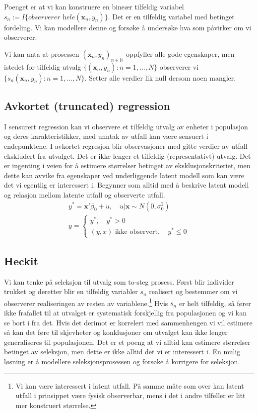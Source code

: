 Poenget er at vi kan konstruere en bineær tilfeldig variabel $s_n := I\{\textit{observerer hele} (\mathbf{x}_n,y_n)\}$. Det er en tilfeldig variabel med betinget fordeling. Vi kan modellere denne og forsøke å undersøke hva som påvirker om vi observerer.

Vi kan anta at prosessen $(\mathbf{x}_n,y_n)_{n\in \mathbb{N}}$ oppfyller alle gode egenskaper, men istedet for tilfeldig utvalg $\{(\mathbf{x}_n,y_n):n=1,\dots,N\}$ observerer vi $\{s_n(\mathbf{x}_n,y_n):n=1,\dots,N\}$. Setter alle verdier lik null dersom noen mangler.
\subsection{Avkortet (truncated) regression}
I sensurert regression kan vi observere et tilfeldig utvalg av enheter i populasjon og deres karakteristikker, med unntak av utfall kan være sensuert i endepunktene. I avkortet regresjon blir observasjoner med gitte verdier av utfall ekskludert fra utvalget. Det er ikke lenger et tilfeldig (representativt) utvalg. Det er ingenting i veien for å estimere størrelser betinget av eksklusjonskriteriet, men dette kan avvike fra egenskaper ved underliggende latent modell som kan være det vi egentlig er interessert i. Begynner som alltid med å beskrive latent modell og relasjon mellom latente utfall og observerte utfall.
\begin{align}
y^* = \mathbf{x}'\beta_0 + u, \quad u|\mathbf{x} \sim N(0,\sigma_0^2) \\
y = \begin{cases}
y^*, \quad y^*>0 \\
(y,x)\text{ ikke observert}, \quad y^* \leq 0
\end{cases}
\end{align}
\subsection{Heckit}
Vi kan tenke på seleksjon til utvalg som to-steg prosess. Først blir individer trukket og deretter blir en tilfeldig variabler $s_n$ realisert og bestemmer om vi observerer realiseringen av resten av variablene.\footnote{Vi kan være interessert i latent utfall. På samme måte som over kan latent utfall i prinsippet være fysisk observerbar, mens i det i andre tilfeller er litt mer konstruert størrelse.} Hvis $s_n$ er helt tilfeldig, så fører ikke frafallet til at utvalget er systematisk forskjellig fra populasjonen og vi kan se bort i fra det. Hvis det derimot er korrelert med sammenhengen vi vil estimere så kan det føre til skjevheter og konklusjoner om utvalget kan ikke lenger generaliseres til populasjonen. Det er et poeng at vi alltid kan estimere størrelser betinget av seleksjon, men dette er ikke alltid det vi er interessert i. En mulig løsning er å modellere seleksjonsprosessen og forsøke å korrigere for seleksjon.

